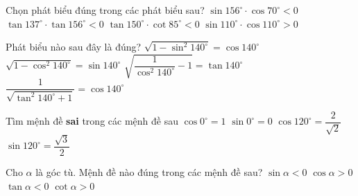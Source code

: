 \begin{ex}
	Chọn phát biểu đúng trong các phát biểu sau?
	\choice
	{$\sin 156^\circ\cdot\cos70^\circ<0$}
	{$\tan 137^\circ\cdot\tan 156^\circ<0$}
	{\True $\tan150^\circ\cdot\cot85^\circ<0$}
	{$\sin 110^\circ\cdot\cos 110^\circ>0$}
\end{ex}
\begin{ex}
	Phát biểu nào sau đây là đúng?
	\choice
	{$\sqrt{1-\sin^2 140^\circ}=\cos 140^\circ$}
	{\True $\sqrt{1-\cos^2 140^\circ}=\sin 140^\circ$}
	{$\sqrt{\dfrac{1}{\cos^2 140^\circ}-1}=\tan 140^\circ$}
	{$\dfrac{1}{\sqrt{\tan^2 140^\circ+1}}=\cos 140^\circ$}
\end{ex}
\begin{ex}
	Tìm mệnh đề \textbf{sai} trong các mệnh đề sau
	\choice
	{$\cos 0^\circ=1$}
	{$\sin 0^\circ=0$}
	{\True $\cos 120^\circ=\dfrac{2}{\sqrt{2}}$}
	{$\sin 120^\circ=\dfrac{\sqrt{3}}{2}$}
\end{ex}
\begin{ex}
	Cho $\alpha$ là góc tù. Mệnh đề nào đúng trong các mệnh đề sau?
	\choice
	{$\sin\alpha<0$}
	{$\cos\alpha>0$}
	{\True $\tan\alpha<0$}
	{$\cot\alpha>0$}
\end{ex}
